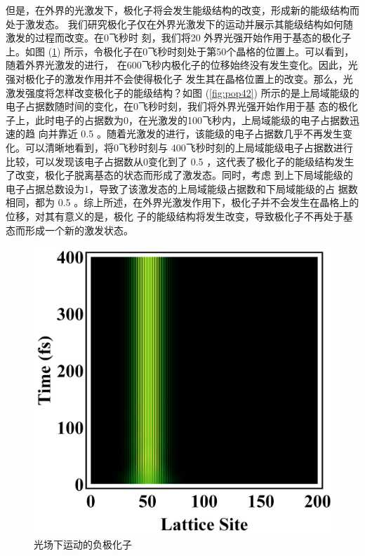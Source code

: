 \documentclass[12pt,]{report}
\begin{document}
但是，在外界的光激发下，极化子将会发生能级结构的改变，形成新的能级结构而处于激发态。
我们研究极化子仅在外界光激发下的运动并展示其能级结构如何随激发的过程而改变。在0飞秒时
刻，我们将20 外界光强开始作用于基态的极化子上。如图
(\ref{fig:polaron_photon})
所示，令极化子在0飞秒时刻处于第50个晶格的位置上。可以看到，随着外界光激发的进行，
在600飞秒内极化子的位移始终没有发生变化。因此，光强对极化子的激发作用并不会使得极化子
发生其在晶格位置上的改变。那么，光激发强度将怎样改变极化子的能级结构？如图
(\ref{fig:pop42})
所示的是上局域能级的电子占据数随时间的变化，在0飞秒时刻，我们将外界光强开始作用于基
态的极化子上，此时电子的占据数为0，在光激发的100飞秒内，上局域能级的电子占据数迅速的趋
向并靠近 0.5
。随着光激发的进行，该能级的电子占据数几乎不再发生变化。可以清晰地看到，将0飞秒时刻与
400飞秒时刻的上局域能级电子占据数进行比较，可以发现该电子占据数从0变化到了
0.5
，这代表了极化子的能级结构发生了改变，极化子脱离基态的状态而形成了激发态。同时，考虑
到上下局域能级的电子占据总数设为1，导致了该激发态的上局域能级占据数和下局域能级的占
据数相同，都为 0.5
。综上所述，在外界光激发作用下，极化子并不会发生在晶格上的位移，对其有意义的是，极化
子的能级结构将发生改变，导致极化子不再处于基态而形成一个新的激发状态。

\begin{figure}[h!]
    \centering
    \includegraphics[scale=0.5]{./figures/epolaron_photon.png}
    \caption{光场下运动的负极化子}
    \label{fig:polaron_photon}
\end{figure}
\end{document}
